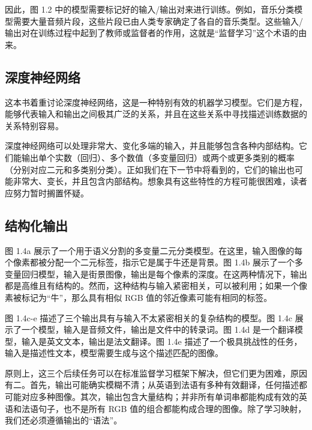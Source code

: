 因此，图 1.2 中的模型需要标记好的输入/输出对来进行训练。例如，音乐分类模型需要大量音频片段，这些片段已由人类专家确定了各自的音乐类型。这些输入/输出对在训练过程中起到了教师或监督者的作用，这就是“监督学习”这个术语的由来。

\subsection{深度神经网络}
这本书着重讨论深度神经网络，这是一种特别有效的机器学习模型。它们是方程，能够代表输入和输出之间极其广泛的关系，并且在这些关系中寻找描述训练数据的关系特别容易。

深度神经网络可以处理非常大、变化多端的输入，并且能够包含各种内部结构。它们能输出单个实数（回归）、多个数值（多变量回归）或两个或更多类别的概率（分别对应二元和多类别分类）。正如我们在下一节中将看到的，它们的输出也可能非常大、变长，并且包含内部结构。想象具有这些特性的方程可能很困难，读者应努力暂时搁置怀疑。

\subsection{结构化输出}
图 1.4a 展示了一个用于语义分割的多变量二元分类模型。在这里，输入图像的每个像素都被分配一个二元标签，指示它是属于牛还是背景。图 1.4b 展示了一个多变量回归模型，输入是街景图像，输出是每个像素的深度。在这两种情况下，输出都是高维且有结构的。然而，这种结构与输入紧密相关，可以被利用；如果一个像素被标记为“牛”，那么具有相似 RGB 值的邻近像素可能有相同的标签。

图 1.4c-e 描述了三个输出具有与输入不太紧密相关的复杂结构的模型。图 1.4c 展示了一个模型，输入是音频文件，输出是文件中的转录词。图 1.4d 是一个翻译模型，输入是英文文本，输出是法文翻译。图 1.4e 描述了一个极具挑战性的任务，输入是描述性文本，模型需要生成与这个描述匹配的图像。

原则上，这三个后续任务可以在标准监督学习框架下解决，但它们更为困难，原因有二。首先，输出可能确实模糊不清；从英语到法语有多种有效翻译，任何描述都可能对应多种图像。其次，输出包含大量结构；并非所有单词串都能构成有效的英语和法语句子，也不是所有 RGB 值的组合都能构成合理的图像。除了学习映射，我们还必须遵循输出的“语法”。

